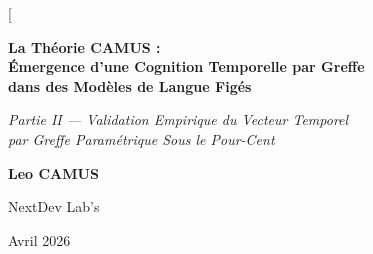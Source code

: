 \documentclass[10pt,twocolumn,letterpaper]{article}
\begin{document}
\twocolumn[
\begin{@twocolumnfalse}
\begin{center}
\vspace*{8mm}

{\LARGE\bfseries La Théorie CAMUS :\\[4pt]
Émergence d'une Cognition Temporelle par Greffe\\[4pt]
dans des Modèles de Langue Figés\par}

\vspace{6mm}

{\large\itshape Partie II --- Validation Empirique du Vecteur Temporel\\
par Greffe Paramétrique Sous le Pour-Cent\par}

\vspace{8mm}

{\large\bfseries Leo CAMUS\par}
\vspace{2mm}
{\normalsize NextDev Lab's\par}
\vspace{2mm}
{\small Avril 2026\par}

\vspace{8mm}

\begin{minipage}{0.92\textwidth}
\renewcommand{\abstractnamefont}{\normalfont\bfseries\large}
\renewcommand{\abstracttextfont}{\normalfont\small}
\begin{abstract}
Ce papier est la suite empirique du premier manuscrit de la Théorie CAMUS~\cite{camus2026}, qui proposait le vecteur temporel à cinq composantes $\mathbf{T}(t) = (\delta_{\text{prev}}, \delta_{\text{session}}, \tau_{\text{inf}}, \omega_{\text{context}}, \rho_{\text{rate}})$ comme primitive cognitive manquante des grands modèles de langue, et formulait cinq prédictions falsifiables (P1--P5). Le papier original était délibérément théorique, un pré-entraînement complet d'un modèle temporellement augmenté étant hors budget des auteurs.


\end{abstract}
\end{minipage}
\end{center}
\end{@twocolumnfalse}
\end{document}
